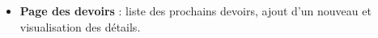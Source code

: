 \documentclass[12pt]{report}
\begin{document}
\begin{itemize}
		\item \textbf{Page des devoirs} : liste des prochains devoirs, ajout d’un nouveau et visualisation des détails.
		
		\begin{figure}[H]
			\centering
			\begin{minipage}[t]{0.32\textwidth}
				\centering

\end{minipage}
\end{figure}
\end{itemize}
\end{document}
